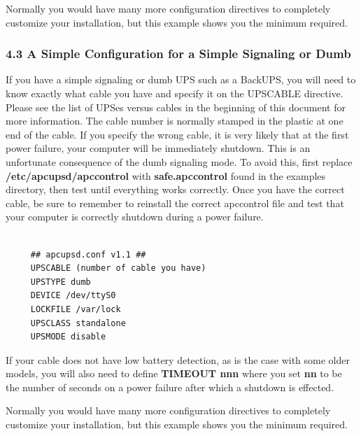 Normally you would have many more configuration directives to completely
customize your installation, but this example shows you the minimum required. 

\label{A-Simple-Configuration-for-a-Simple-Signaling-or-Dumb}

\subsubsection*{4.3 A Simple Configuration for a Simple Signaling or Dumb}

\label{index-Configuration_002c-dumb-71}
\label{index-dumb_002c-configuration-72}
\label{index-Example_002c-dumb-conf-73}
If you have a simple signaling or dumb UPS such as a BackUPS, you will need to
know exactly what cable you have and specify it on the UPSCABLE directive.
Please see the list of UPSes versus cables in the beginning of this document
for more information. The cable number is normally stamped in the plastic at
one end of the cable. If you specify the wrong cable, it is very likely that
at the first power failure, your computer will be immediately shutdown. This
is an unfortunate consequence of the dumb signaling mode.  To avoid this,
first replace {\bf /etc/apcupsd/apccontrol} with {\bf safe.apccontrol} found
in the examples directory, then test until everything works correctly. Once
you have the correct cable, be sure to remember to reinstall the correct
apccontrol file and test that your computer is correctly shutdown during a
power failure. 

\footnotesize
\begin{verbatim}
     
     ## apcupsd.conf v1.1 ##
     UPSCABLE (number of cable you have)
     UPSTYPE dumb
     DEVICE /dev/ttyS0
     LOCKFILE /var/lock
     UPSCLASS standalone
     UPSMODE disable
\end{verbatim}
\normalsize

If your cable does not have low battery detection, as is the case with some
older models, you will also need to define {\bf TIMEOUT nnn} where you set
{\bf nn} to be the number of seconds on a power failure after which a shutdown
is effected.  

Normally you would have many more configuration directives to completely
customize your installation, but this example shows you the minimum required. 

